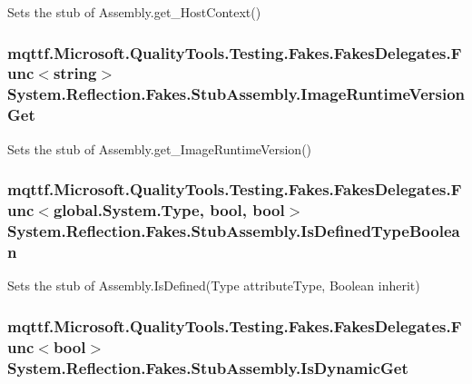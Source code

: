 Sets the stub of Assembly.\-get\-\_\-\-Host\-Context()

\hypertarget{class_system_1_1_reflection_1_1_fakes_1_1_stub_assembly_aad4b98362fa1377f9cb4dfa34d50c32f}{
\subsubsection[{Image\-Runtime\-Version\-Get}]{\setlength{\rightskip}{0pt plus 5cm}mqttf.\-Microsoft.\-Quality\-Tools.\-Testing.\-Fakes.\-Fakes\-Delegates.\-Func$<$string$>$ System.\-Reflection.\-Fakes.\-Stub\-Assembly.\-Image\-Runtime\-Version\-Get}}\label{class_system_1_1_reflection_1_1_fakes_1_1_stub_assembly_aad4b98362fa1377f9cb4dfa34d50c32f}


Sets the stub of Assembly.\-get\-\_\-\-Image\-Runtime\-Version()

\hypertarget{class_system_1_1_reflection_1_1_fakes_1_1_stub_assembly_a36cc43fc82785b455fb3b5a1eb89dd76}{
\subsubsection[{Is\-Defined\-Type\-Boolean}]{\setlength{\rightskip}{0pt plus 5cm}mqttf.\-Microsoft.\-Quality\-Tools.\-Testing.\-Fakes.\-Fakes\-Delegates.\-Func$<$global.\-System.\-Type, bool, bool$>$ System.\-Reflection.\-Fakes.\-Stub\-Assembly.\-Is\-Defined\-Type\-Boolean}}\label{class_system_1_1_reflection_1_1_fakes_1_1_stub_assembly_a36cc43fc82785b455fb3b5a1eb89dd76}


Sets the stub of Assembly.\-Is\-Defined(\-Type attribute\-Type, Boolean inherit)

\hypertarget{class_system_1_1_reflection_1_1_fakes_1_1_stub_assembly_afa95e8cb53a4e138f215a312bb98b361}{
\subsubsection[{Is\-Dynamic\-Get}]{\setlength{\rightskip}{0pt plus 5cm}mqttf.\-Microsoft.\-Quality\-Tools.\-Testing.\-Fakes.\-Fakes\-Delegates.\-Func$<$bool$>$ System.\-Reflection.\-Fakes.\-Stub\-Assembly.\-Is\-Dynamic\-Get}}\label{class_system_1_1_reflection_1_1_fakes_1_1_stub_assembly_afa95e8cb53a4e138f215a312bb98b361}


